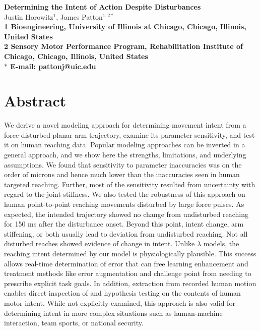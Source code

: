 \documentclass[10pt]{article}
\date{}
\begin{document}
\begin{flushleft}
{\Large
\textbf{Determining the Intent of Action Despite Disturbances}
}
\\
Justin Horowitz$^{1}$, 
James Patton$^{1,2\ast}$
\\
\bf{1} Bioengineering, University of Illinois at Chicago, Chicago, Illinois, United States
\\
\bf{2} Sensory Motor Performance Program, Rehabilitation Institute of Chicago, Chicago, Illinois, United States
\\
$\ast$ E-mail: pattonj@uic.edu
\end{flushleft}

\section*{Abstract}
We derive a novel modeling approach for determining movement intent from a force-disturbed planar arm trajectory, examine its parameter sensitivity, and test it on human reaching data. Popular modeling approaches can be inverted in a general approach, and we show here the strengths, limitations, and underlying assumptions. We found that sensitivity to parameter inaccuracies was on the order of microns and hence much lower than the inaccuracies seen in human targeted reaching. Further, most of the sensitivity resulted from uncertainty with regard to the joint stiffness. We also tested the robustness of this approach on human point-to-point reaching movements disturbed by large force pulses. As expected, the intended trajectory showed no change from undisturbed reaching for 150 ms after the disturbance onset. Beyond this point, intent change, arm stiffening, or both usually lead to deviation from undisturbed reaching. Not all disturbed reaches showed evidence of change in intent. Unlike $\lambda$ models, the reaching intent determined by our model is physiologically plausible. This success allows real-time determination of error that can free learning enhancement and treatment methods like error augmentation and challenge point from needing to prescribe explicit task goals. In addition, extraction from recorded human motion enables direct inspection of and hypothesis testing on the contents of human motor intent. While not explicitly examined, this approach is also valid for determining intent in more complex situations such as human-machine interaction, team sports, or national security.
\end{document}
